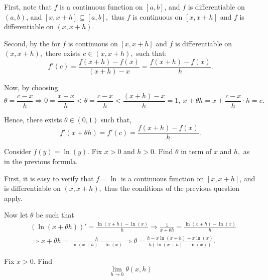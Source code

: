 \documentclass{article}
\begin{document}
\begin{soln}
    First, note that $f$ is a continuous function on $[a,b]$, and $f$ is differentiable on $(a,b)$, and $[x, x+h] \subseteq [a,b],$
    thus $f$ is continuous on $[x, x+h]$ and $f$ is differentiable on $(x, x+h).$ 

    Second, by the  for $f$ is continuous on $[x, x+h]$ and $f$ is differentiable on $(x, x+h),$ 
    there exists $c \in (x, x+h),$ such that:
    \[
        f'(c) = \frac{f(x+h)-f(x)}{(x+h) - x} = \frac{f(x+h) - f(x)}{h}.
    \]

    Now, by choosing 
    \[ 
        \theta = \dfrac{c-x}{h} \Rightarrow 0 = \dfrac{x-x}{h} < \theta = \dfrac{c-x}{h} < \dfrac{(x+h)-x}{h} = 1,\ x + \theta h = x + \dfrac{c-x}{h} \cdot h = c.
    \]        

    Hence, there exists $\theta \in (0,1)$ such that, 
    \[
        f'(x + \theta h) = f'(c) = \dfrac{f(x+h) - f(x)}{h}.
    \]
\end{soln}

\bigbreak

\begin{problem*}[2b]
    Consider $f(y) = \ln(y).$ Fix $x >0$ and $h>0.$ Find $\theta$ in term of $x$ and $h,$ as in the previous formula.
\end{problem*}

\begin{soln}
    First, it is easy to verify that $f=\ln$ is a continuous function on $[x,x+h]$, and is differentiable on $(x, x+h),$
    thus the conditions of the previous question apply.
    
    Now let $\theta$ be such that
    \[
        \begin{aligned}
            &(\ln(x + \theta h))' = \frac{\ln(x+h) - \ln(x)}{h} \Rightarrow \frac{1}{x + \theta h} = \frac{\ln(x+h) - \ln(x)}{h}\\
            &\Rightarrow x + \theta h = \frac{h}{\ln(x+h) - \ln(x)} \Rightarrow \theta = \boxed{\frac{h - x \ln(x+h) + x \ln(x)}{h(\ln(x+h) - \ln(x))}.}
        \end{aligned}
    \]
\end{soln}

\newpage

\begin{problem*}[2c]
    Fix $x >0.$ Find
    \[
        \lim_{h \rightarrow 0} \theta(x,h)
    \]
\end{problem*}
\end{document}
